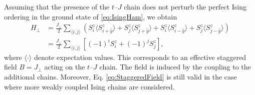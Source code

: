 \documentclass[%
 reprint,
 amsmath,amssymb,
 aps, onecolumn,
prl,
]{revtex4-1}
\newcommand{\mean}[1]{\langle#1\rangle}
\begin{document}
Assuming that the presence of the $t$--$J$ chain does not perturb the perfect Ising ordering in the ground state of \eqref{eq:IsingHam}, we obtain
\begin{align}
	H_\perp 
	&= \frac{J_\perp}{2} \sum_{\mean{i,j}} \left( S_{i}^z \mean{S_{i+\hat{y}}^z} + S_{j}^z \mean{S_{j+\hat{y}}^z} + S_{i}^z \mean{S_{i-\hat{y}}^z} + S_{j}^z \mean{S_{j-\hat{y}}^z} \right) \\
	&= \frac{J_\perp}{2} \sum_{\mean{i,j}} \left[(-1)^i S_{i}^z + (-1)^j S_{j}^z \right],
	\label{eq:StaggeredField}
\end{align}
where $\langle \cdot \rangle$ denote expectation values.
%
This corresponds to an effective staggered field $B = J_\perp$ acting on the $t$--$J$ chain. The field is induced by the coupling to the additional chains. Moreover, Eq. \eqref{eq:StaggeredField} is still valid in the case where more weakly coupled Ising chains are considered.\\
\end{document}
